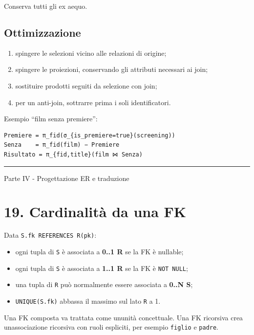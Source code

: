 \documentclass[
  10pt,
  a4paper,
]{article}
\providecommand{\tightlist}{%
  \setlength{\itemsep}{0pt}\setlength{\parskip}{0pt}}
\begin{document}
Conserva tutti gli ex aequo.

\subsection{Ottimizzazione}\label{ottimizzazione}

\begin{enumerate}
\def\labelenumi{\arabic{enumi}.}
\tightlist
\item
  spingere le selezioni vicino alle relazioni di origine;
\item
  spingere le proiezioni, conservando gli attributi necessari ai join;
\item
  sostituire prodotti seguiti da selezione con join;
\item
  per un anti-join, sottrarre prima i soli identificatori.
\end{enumerate}

Esempio ``film senza premiere'':

\begin{verbatim}
Premiere = π_fid(σ_{is_premiere=true}(screening))
Senza    = π_fid(film) − Premiere
Risultato = π_{fid,title}(film ⋈ Senza)
\end{verbatim}

\begin{center}\rule{0.5\linewidth}{0.5pt}\end{center}

Parte IV - Progettazione ER e traduzione

\section{19. Cardinalità da una FK}\label{19-cardinalituxe0-da-una-fk}

Data \texttt{S.fk\ REFERENCES\ R(pk)}:

\begin{itemize}
\tightlist
\item
  ogni tupla di \texttt{S} è associata a \textbf{0..1 R} se la FK è
  nullable;
\item
  ogni tupla di \texttt{S} è associata a \textbf{1..1 R} se la FK è
  \texttt{NOT\ NULL};
\item
  una tupla di \texttt{R} può normalmente essere associata a
  \textbf{0..N S};
\item
  \texttt{UNIQUE(S.fk)} abbassa il massimo sul lato \texttt{R} a 1.
\end{itemize}

Una FK composta va trattata come un\textquotesingle unità concettuale.
Una FK ricorsiva crea un\textquotesingle associazione ricorsiva con
ruoli espliciti, per esempio \texttt{figlio} e \texttt{padre}.
\end{document}
